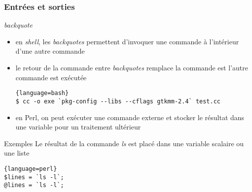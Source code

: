 \begin{frame}[fragile]
  \frametitle{Entrées et sorties}

  \begin{block}{\textit{backquote}}
    \begin{itemize}
    \item en \textit{shell}, les \textit{backquotes} permettent d'invoquer
      une commande à l'intérieur d'une autre commande
    \item le retour de la commande entre \textit{backquotes} remplace la
      commande est l'autre commande est exécutée
      \begin{lstlisting}{language=bash}
$ cc -o exe `pkg-config --libs --cflags gtkmm-2.4` test.cc
      \end{lstlisting}
    \item en Perl, on peut exécuter une commande externe et stocker le résultat
      dans une variable pour un traitement ultérieur
    \end{itemize}
  \end{block}

  \begin{exampleblock}{Exemples}
    Le résultat de la commande \textit{ls} est placé dans une variable scalaire
    ou une liste
    \begin{lstlisting}{language=perl}
$lines = `ls -l`;
@lines = `ls -l`;
    \end{lstlisting}
  \end{exampleblock}

\end{frame}

